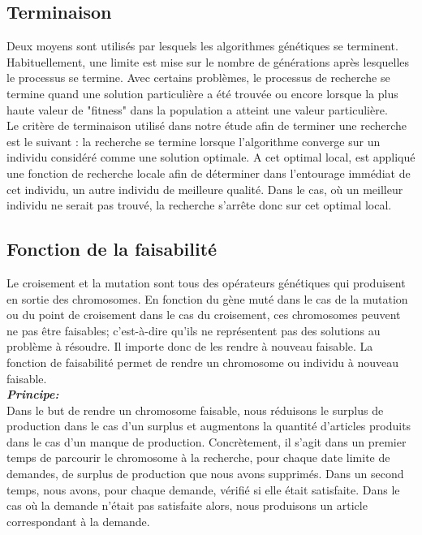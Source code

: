 	\subsection{Terminaison}
	Deux moyens sont utilisés par lesquels les algorithmes génétiques se terminent. Habituellement, une limite est mise sur le nombre de générations après lesquelles le processus se termine. Avec certains problèmes, le processus de recherche se termine quand une solution particulière a été trouvée ou encore lorsque la plus haute valeur de "fitness" dans la population a atteint une valeur particulière. \\
	\hspace*{.5cm} Le critère de terminaison utilisé dans notre étude afin de terminer une recherche est le suivant : la recherche se termine lorsque l'algorithme converge sur un individu considéré comme une solution optimale. A cet optimal local, est appliqué une fonction de recherche locale afin de déterminer dans l'entourage immédiat de cet individu, un autre individu de meilleure qualité. Dans le cas, où un meilleur individu ne serait pas trouvé, la recherche s’arrête donc sur cet optimal local.
	
	\subsection{Fonction de la faisabilité}
	Le croisement et la mutation sont tous des opérateurs génétiques qui produisent en sortie des chromosomes. En fonction du gène muté dans le cas de la mutation ou du point de croisement dans le cas du croisement, ces chromosomes peuvent ne pas être faisables; c'est-à-dire qu'ils ne représentent pas des solutions au problème à résoudre. Il importe donc de les rendre à nouveau faisable. La fonction de faisabilité permet de rendre un chromosome ou individu à nouveau faisable. \\
	
	\hspace*{.5cm} \textbf{\textsl{Principe:}}\\	
	\hspace*{.5cm} Dans le but de rendre un chromosome faisable, nous  réduisons le surplus de production dans le cas d'un surplus et augmentons la quantité d'articles produits dans le cas d'un manque de production. Concrètement, il s'agit dans un premier temps de parcourir le chromosome à la recherche, pour chaque date limite de demandes, de surplus de production que nous avons supprimés. Dans un second temps, nous avons, pour chaque demande, vérifié si elle était satisfaite. Dans le cas où la demande n'était pas satisfaite alors, nous produisons un article correspondant à la demande. \\
	
